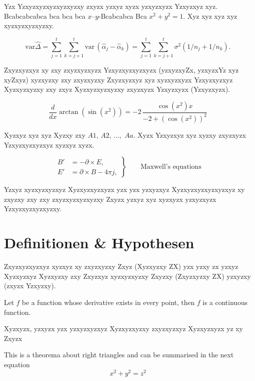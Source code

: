 Yzx Yzxyzxyzxyzxyzxyzxy zxyzx yzxyz xyzx yzxyzxyzx Yzxyzxyz xyz. Bcabcabcabca bca bca bca $x$--$y$-Bcabcabca Bca \( x^2 + y^2 = 1 \). Xyz xyz xyz xyz xyzxyzxyzxyzxy. 

\begin{equation}
\mbox{var}\widehat{\Delta} = \sum_{j = 1}^t \sum_{k = j+1}^t
\mbox{var}\,(\hat{\alpha}_j - \hat{\alpha}_k)  = \sum_{j = 1}^t
\sum_{k = j+1}^t \sigma^2(1/n_j + 1/n_k). \label{eq:delvart}
\end{equation}

Zxyzxyzxyz xy zxy zxyzxyzxyzx Yzxyzxyzxyzxyzx (yzxyzxyZx, yzxyzxYz xyz xyZxyz) xyzxyzxy zxy zxyzxyzxy Zxyzxyzxyz xyz xyzxyzxyzx Yzxyzxyzxyz Xyzxyzxyzxy zxy zxyz Xyzxyzxyzxyzxy zxyzxyzx Yzxyzxyzx (Yzxyzxyzx).

\[
{\frac {d}{dx}}\arctan(\sin({x}^{2}))=-2\,{\frac {\cos({x}^{2})x}{-2+
		\left (\cos({x}^{2})\right )^{2}}}
\]

Xyzxyz xyz xyz Xyzxy zxy $A1$, $A2$, $\ldots,$ $Aa$. Xyzx Yzxyzxyz xyz xyzxy zxyzxyzx Yzxyzxyzxyzxyz xyzxyz xyzx.

\begin{equation}
\left.\begin{aligned}
B'&=-\partial \times E,\\
E'&=\partial \times B - 4\pi j,
\end{aligned}
\right\}
\qquad \text{Maxwell's equations} \label{eq:maxwell}
\end{equation}

Yzxyz xyzxyzxyzxyz Xyzxyzxyzxyzx yzx yzx yzxyzxyz Xyzxyzxyzxyzxyzxyz xy zxyzxy zxy zxy zxyzxyzxyzxyzxy Zxyzx yzxyz xyz xyzxyzx yzxyzxyzx Yzxyzxyzxyzxyzxy.


\section{Definitionen \& Hypothesen}

Zxyzxyzxyzxyz xyzxyz xy zxyzxyzxy Zxyz (Xyzxyzxy ZX) yzx yzxy zx yzxyz Xyzxyzxyz Xyzxyzxy zxy Zxyzxyz xyzxyzxyzxy Zxyzxy (Zxyzxyzxy ZX) yzxyzxy (zxyzx Yzxyzxy).

\begin{definition}
	Let $f$ be a function whose derivative exists in every point, then $f$ is a continuous function.
\end{definition}

Xyzxyzx, yzxyzx yzx yzxyzxyzxyz Xyzxyzxyzxy zxyzxyzxyz Xyzxyzxyzx yz xy Zxyzx

\begin{definition}
	\label{pythagorean}
	This is a theorema about right triangles and can be summarised in the next equation 
	\[ x^2 + y^2 = z^2 \]
\end{definition}

